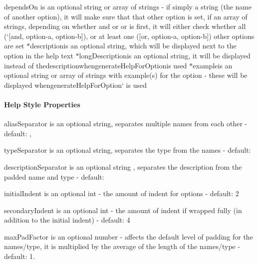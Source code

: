 \begin{DoxyItemize}
\item {\ttfamily depends\+On} is an optional string or array of strings -\/ if simply a string (the name of another option), it will make sure that that other option is set, if an array of strings, depending on whether {\ttfamily \textquotesingle{}and\textquotesingle{}} or {\ttfamily \textquotesingle{}or\textquotesingle{}} is first, it will either check whether all (`\mbox{[}\textquotesingle{}and\textquotesingle{}, \textquotesingle{}option-\/a\textquotesingle{}, \textquotesingle{}option-\/b\textquotesingle{}\mbox{]}{\ttfamily ), or at least one (}\mbox{[}\textquotesingle{}or\textquotesingle{}, \textquotesingle{}option-\/a\textquotesingle{}, \textquotesingle{}option-\/b\textquotesingle{}\mbox{]}{\ttfamily ) other options are set $\ast$}description{\ttfamily is an optional string, which will be displayed next to the option in the help text $\ast$}long\+Description{\ttfamily is an optional string, it will be displayed instead of the}description{\ttfamily when}generate\+Help\+For\+Option{\ttfamily is used $\ast$}example{\ttfamily is an optional string or array of strings with example(s) for the option -\/ these will be displayed when}generate\+Help\+For\+Option` is used
\end{DoxyItemize}

\paragraph*{Help Style Properties}


\begin{DoxyItemize}
\item {\ttfamily alias\+Separator} is an optional string, separates multiple names from each other -\/ default\+: \textquotesingle{} ,\textquotesingle{}
\item {\ttfamily type\+Separator} is an optional string, separates the type from the names -\/ default\+: \textquotesingle{} \textquotesingle{}
\item {\ttfamily description\+Separator} is an optional string , separates the description from the padded name and type -\/ default\+: \textquotesingle{} \textquotesingle{}
\item {\ttfamily initial\+Indent} is an optional int -\/ the amount of indent for options -\/ default\+: 2
\item {\ttfamily secondary\+Indent} is an optional int -\/ the amount of indent if wrapped fully (in addition to the initial indent) -\/ default\+: 4
\item {\ttfamily max\+Pad\+Factor} is an optional number -\/ affects the default level of padding for the names/type, it is multiplied by the average of the length of the names/type -\/ default\+: 1.
\end{DoxyItemize}

